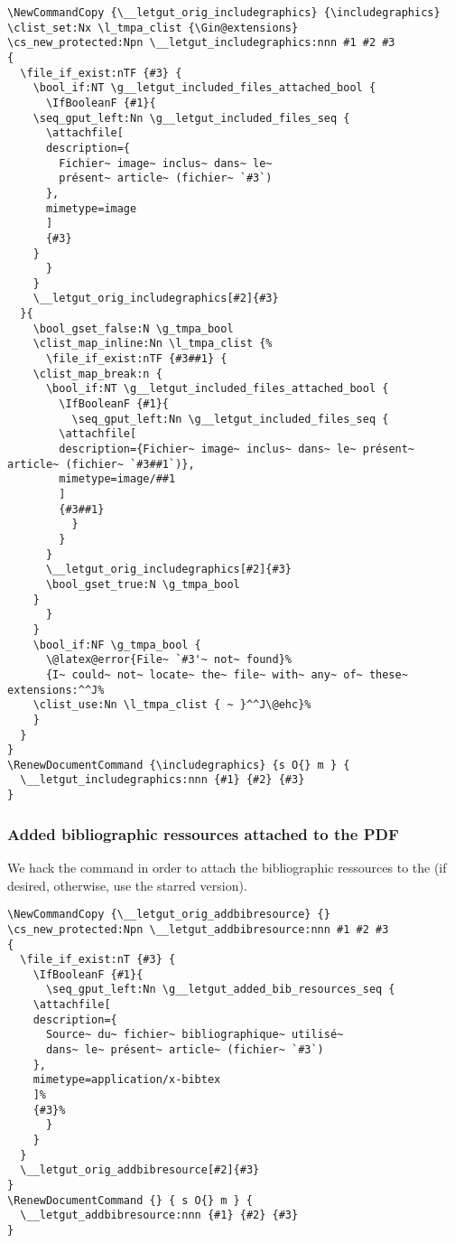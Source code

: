 \documentclass{letgut}
\begin{document}
\begin{lstlisting}
\NewCommandCopy {\__letgut_orig_includegraphics} {\includegraphics}
\clist_set:Nx \l_tmpa_clist {\Gin@extensions}
\cs_new_protected:Npn \__letgut_includegraphics:nnn #1 #2 #3
{
  \file_if_exist:nTF {#3} {
    \bool_if:NT \g__letgut_included_files_attached_bool {
      \IfBooleanF {#1}{
	\seq_gput_left:Nn \g__letgut_included_files_seq {
	  \attachfile[
	  description={
	    Fichier~ image~ inclus~ dans~ le~
	    présent~ article~ (fichier~ `#3`)
	  },
	  mimetype=image
	  ]
	  {#3}
	}
      }
    }
    \__letgut_orig_includegraphics[#2]{#3}
  }{
    \bool_gset_false:N \g_tmpa_bool
    \clist_map_inline:Nn \l_tmpa_clist {%
      \file_if_exist:nTF {#3##1} {
	\clist_map_break:n {
	  \bool_if:NT \g__letgut_included_files_attached_bool {
	    \IfBooleanF {#1}{
	      \seq_gput_left:Nn \g__letgut_included_files_seq {
		\attachfile[
		description={Fichier~ image~ inclus~ dans~ le~ présent~ article~ (fichier~ `#3##1`)},
		mimetype=image/##1
		]
		{#3##1}
	      }
	    }
	  }
	  \__letgut_orig_includegraphics[#2]{#3}
	  \bool_gset_true:N \g_tmpa_bool
	}
      }
    }
    \bool_if:NF \g_tmpa_bool {
      \@latex@error{File~ `#3'~ not~ found}%
      {I~ could~ not~ locate~ the~ file~ with~ any~ of~ these~ extensions:^^J%
	\clist_use:Nn \l_tmpa_clist { ~ }^^J\@ehc}%
    }
  }
}
\RenewDocumentCommand {\includegraphics} {s O{} m } {
  \__letgut_includegraphics:nnn {#1} {#2} {#3}
}
\end{lstlisting}

\subsubsection{Added bibliographic ressources attached to the PDF}
\label{ImplementationMiscellanousAddedbibliographicressourcesattachedtothePDF-l4e34ja00pj0}
We hack the \lstinline++ command in order to attach the bibliographic
ressources to the \pdf{} (if desired, otherwise, use the starred version).

\begin{lstlisting}
\NewCommandCopy {\__letgut_orig_addbibresource} {}
\cs_new_protected:Npn \__letgut_addbibresource:nnn #1 #2 #3
{
  \file_if_exist:nT {#3} {
    \IfBooleanF {#1}{
      \seq_gput_left:Nn \g__letgut_added_bib_resources_seq {
	\attachfile[
	description={
	  Source~ du~ fichier~ bibliographique~ utilisé~
	  dans~ le~ présent~ article~ (fichier~ `#3`)
	},
	mimetype=application/x-bibtex
	]%
	{#3}%
      }
    }
  }
  \__letgut_orig_addbibresource[#2]{#3}
}
\RenewDocumentCommand {} { s O{} m } {
  \__letgut_addbibresource:nnn {#1} {#2} {#3}
}
\end{lstlisting}
\end{document}
